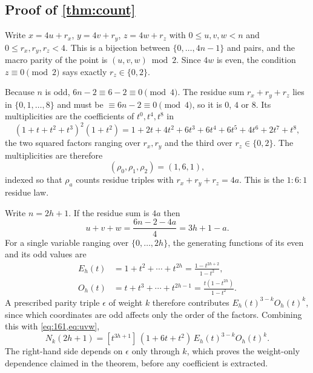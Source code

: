 \documentclass[11pt]{amsart}
\theoremstyle{definition}
\theoremstyle{remark}
\begin{document}
\subsection*{Proof of \cref{thm:count}}

Write $x = 4u + r_x$, $y = 4v + r_y$, $z = 4w + r_z$ with $0 \le u,v,w < n$ and $0 \le r_x,r_y,r_z < 4$. This is a bijection between $\{0,\dots,4n-1\}$ and pairs, and the macro parity of the point is $(u,v,w) \bmod 2$. Since $4w$ is even, the condition $z \equiv 0 \pmod 2$ says exactly $r_z \in \{0,2\}$.

Because $n$ is odd, $6n-2 \equiv 6-2 \equiv 0 \pmod 4$. The residue sum $r_x+r_y+r_z$ lies in $\{0,1,\dots,8\}$ and must be $\equiv 6n-2 \equiv 0 \pmod 4$, so it is $0$, $4$ or $8$. Its multiplicities are the coefficients of $t^0, t^4, t^8$ in
\[
(1+t+t^2+t^3)^2(1+t^2) = 1+2t+4t^2+6t^3+6t^4+6t^5+4t^6+2t^7+t^8,
\]
the two squared factors ranging over $r_x, r_y$ and the third over $r_z \in \{0,2\}$. The multiplicities are therefore
\begin{equation}
(\rho_0,\rho_1,\rho_2) = (1,6,1),
\label{eq:161}
\end{equation}
indexed so that $\rho_a$ counts residue triples with $r_x+r_y+r_z = 4a$. This is the $1:6:1$ residue law.

Write $n = 2h+1$. If the residue sum is $4a$ then
\begin{equation}
u+v+w = \frac{6n-2-4a}{4} = 3h+1-a.
\label{eq:uvw}
\end{equation}
For a single variable ranging over $\{0,\dots,2h\}$, the generating functions of its even and its odd values are
\[
\begin{aligned}
E_h(t) &= 1+t^2+\cdots+t^{2h} = \frac{1-t^{2h+2}}{1-t^2},\\
O_h(t) &= t+t^3+\cdots+t^{2h-1} = \frac{t(1-t^{2h})}{1-t^2}.
\end{aligned}
\]
A prescribed parity triple $\epsilon$ of weight $k$ therefore contributes $E_h(t)^{3-k}O_h(t)^{k}$, since which coordinates are odd affects only the order of the factors. Combining this with \cref{eq:161,eq:uvw},
\begin{equation}
N_k(2h+1) = [t^{3h+1}]\,(1+6t+t^2)\,E_h(t)^{3-k}O_h(t)^{k}.
\label{eq:gf}
\end{equation}
The right-hand side depends on $\epsilon$ only through $k$, which proves the weight-only dependence claimed in the theorem, before any coefficient is extracted.
\end{document}
